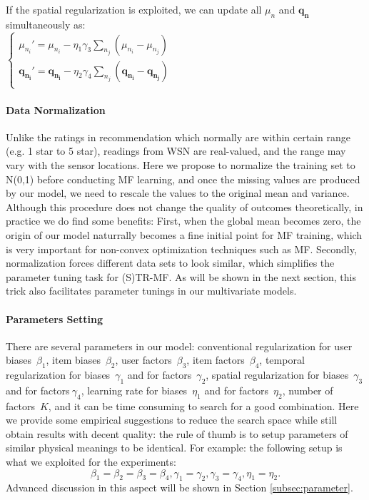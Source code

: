 If the spatial regularization is exploited, we can update all $\mu_n$ and $\mathbf{q_n}$ simultaneously as:\\
\indent $\begin{cases}
	\mu_{n_i}' = \mu_{n_i} - \eta_1 \gamma_3 \sum_{n_j}{(\mu_{n_i} - \mu_{n_j})}\\
	\mathbf{q_{n_i}}' = \mathbf{q_{n_i}} - \eta_2 \gamma_4 \sum_{n_j}{(\mathbf{q_{n_i}} - \mathbf{q_{n_j}})}\\
	\end{cases}$\\


\paragraph*{Data Normalization}

Unlike the ratings in recommendation which normally are within certain range (e.g. 1 star to 5 star), readings from WSN are real-valued, and the range may vary with the sensor locations.
Here we propose to normalize the training set to N(0,1) before conducting MF learning, and once the missing values are produced by our model, we need to rescale the values to the original mean and variance.
Although this procedure does not change the quality of outcomes theoretically, in practice we do find some benefits: 
First, when the global mean becomes zero, the origin of our model naturrally becomes a fine initial point for MF training, which is very important for non-convex optimization techniques such as MF.
Secondly, normalization forces different data sets to look similar, which simplifies the parameter tuning task for (S)TR-MF. As will be shown in the next section, this trick also facilitates parameter tunings in our multivariate models.  



\paragraph*{Parameters Setting}
There are several parameters in our model: conventional regularization for user biases~$\beta_1$, item biases~$\beta_2$, user factors~$\beta_3$, item factors~$\beta_4$, temporal regularization for biases~$\gamma_1$ and for factors~$\gamma_2$, spatial regularization for biases~$\gamma_3$ and for factors$~\gamma_4$, learning rate for biases~$\eta_1$ and for factors~$\eta_2$, number of factors~$K$, and it can be time consuming to search for a good combination. Here we provide some empirical suggestions to reduce the search space while still obtain results with decent quality: the rule of thumb is to setup parameters of similar physical meanings to be identical. For example: the following setup is what we exploited for the experiments:
\begin{equation*}\beta_1 = \beta_2 = \beta_3 = \beta_4, \gamma_1 = \gamma_2, \gamma_3 = \gamma_4, \eta_1 = \eta_2. \end{equation*}
Advanced discussion in this aspect will be shown in Section \ref{subsec:parameter}.

